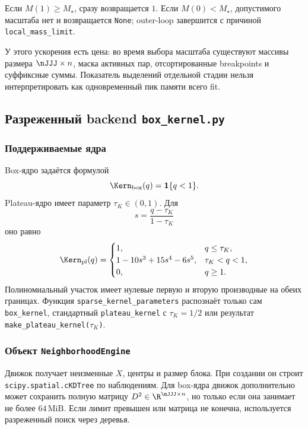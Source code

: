 Если $M(1)\geq M_{\star}$, сразу возвращается $1$. Если
$M(0)<M_{\star}$, допустимого масштаба нет и возвращается
\texttt{None}; outer-loop завершится с причиной
\texttt{local\_mass\_limit}.

У этого ускорения есть цена: во время выбора масштаба существуют
массивы размера $\nJJJ\times n$, маска активных пар, отсортированные
breakpoints и суффиксные суммы. Показатель выделений отдельной стадии
нельзя интерпретировать как одновременный пик памяти всего fit.

\subsection{Разреженный backend \texttt{box\_kernel.py}}

\subsubsection{Поддерживаемые ядра}

Box-ядро задаётся формулой
\begin{equation}
    \Kern_{\mathrm{box}}(q)
    =\mathbf 1\{q<1\}.
\label{eq:box-kernel}
\end{equation}
Plateau-ядро имеет параметр $\tau_{K}\in(0,1)$. Для
\begin{equation}
    s=\frac{q-\tau_K}{1-\tau_K}
\end{equation}
оно равно
\begin{equation}
    \Kern_{\mathrm{pl}}(q)
    =
    \begin{cases}
    1, & q\leq\tau_K,\\
    1-10s^3+15s^4-6s^5, & \tau_K<q<1,\\
    0, & q\geq1.
    \end{cases}
\label{eq:plateau-kernel}
\end{equation}
Полиномиальный участок имеет нулевые первую и вторую производные на
обеих границах. Функция \texttt{sparse\_kernel\_parameters}
распознаёт только сам \texttt{box\_kernel}, стандартный
\texttt{plateau\_kernel} с $\tau_K=1/2$ или результат
\texttt{make\_plateau\_kernel($\tau_K$)}.

\subsubsection{Объект \texttt{NeighborhoodEngine}}

Движок получает неизменные $X$, центры и размер блока. При создании он
строит \texttt{scipy.spatial.cKDTree} по наблюдениям. Для box-ядра
движок дополнительно может сохранить полную матрицу
$D^2\in\R^{\nJJJ\times n}$, но только если она занимает не более
$64\,\mathrm{MiB}$. Если лимит превышен или матрица не конечна,
используется разреженный поиск через деревья.


